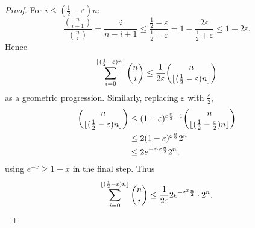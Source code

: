 \documentclass{article}
\DeclarePairedDelimiter\floor{\lfloor}{\rfloor}
\let\epsilon\varepsilon
\begin{document}
\begin{proof}
  For $i \leq (\frac{1}{2} - \epsilon) n:$
  \begin{equation*}
    \frac{\binom{n}{i-1}}{\binom{n}{i}} = \frac{i}{n-i+1} \leq \frac{\frac{1}{2} - \epsilon}{\frac{1}{2} + \epsilon} = 1 - \frac{2\epsilon}{\frac{1}{2} + \epsilon} \leq 1 - 2\epsilon.
  \end{equation*}
  Hence
  \begin{equation*}
    \sum_{i=0}^{\floor{(\frac{1}{2}-\epsilon) n}} \binom{n}{i} \leq \frac{1}{2\epsilon} \binom{n}{\floor{(\frac{1}{2} - \epsilon) n}}
  \end{equation*}
  as a geometric progression.
  Similarly, replacing $\epsilon$ with $\frac \epsilon 2$,
  \begin{align*}
    \binom{n}{\floor{(\frac{1}{2} - \epsilon)n}} &\leq (1-\epsilon)^{\epsilon \frac{n}{2} - 1} \binom{n}{\floor{(\frac{1}{2} - \frac{\epsilon}{2}) n}} \\
                                                 &\leq 2(1-\epsilon)^{\epsilon\frac{n}2} 2^n \\
                                                 &\leq 2 e^{-\epsilon \cdot \epsilon \frac n2} 2^n,
  \end{align*}
  using $e^{-x} \geq 1-x$ in the final step.
  Thus
  \begin{equation*}
    \sum_{i=0}^{\floor{(\frac{1}{2} - \epsilon) n}} \binom{n}{i}\leq \frac{1}{2\epsilon} 2 e^{-\epsilon^2 \frac{n}{2}} \cdot 2^n. \qedhere
  \end{equation*}
\end{proof}
\end{document}
